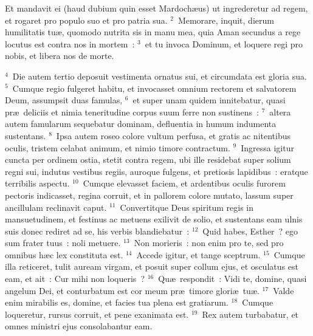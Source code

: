 \lettrine[lines=10,image=true,loversize=0.05,lraise=-0.03]{E}{}t mandavit ei (haud dubium quin esset Mardoch\ae us) ut ingrederetur ad regem, et rogaret pro populo suo et pro patria sua.
${}^{2}$~Memorare, inquit, dierum humilitatis tu\ae , quomodo nutrita sis in manu mea, quia Aman secundus a rege locutus est contra nos in mortem~:
${}^{3}$~et tu invoca Dominum, et loquere regi pro nobis, et libera nos de morte.


${}^{4}$~Die autem tertio deposuit vestimenta ornatus sui, et circumdata est gloria sua.
${}^{5}$~Cumque regio fulgeret habitu, et invocasset omnium rectorem et salvatorem Deum, assumpsit duas famulas,
${}^{6}$~et super unam quidem innitebatur, quasi pr\ae\ deliciis et nimia teneritudine corpus suum ferre non sustinens~:
${}^{7}$~altera autem famularum sequebatur dominam, defluentia in humum indumenta sustentans.
${}^{8}$~Ipsa autem roseo colore vultum perfusa, et gratis ac nitentibus oculis, tristem celabat animum, et nimio timore contractum.
${}^{9}$~Ingressa igitur cuncta per ordinem ostia, stetit contra regem, ubi ille residebat super solium regni sui, indutus vestibus regiis, auroque fulgens, et pretiosis lapidibus~: eratque terribilis aspectu.
${}^{10}$~Cumque elevasset faciem, et ardentibus oculis furorem pectoris indicasset, regina corruit, et in pallorem colore mutato, lassum super ancillulam reclinavit caput.
${}^{11}$~Convertitque Deus spiritum regis in mansuetudinem, et festinus ac metuens exilivit de solio, et sustentans eam ulnis suis donec rediret ad se, his verbis blandiebatur~:
${}^{12}$~Quid habes, Esther~? ego sum frater tuus~: noli metuere.
${}^{13}$~Non morieris~: non enim pro te, sed pro omnibus h\ae c lex constituta est.
${}^{14}$~Accede igitur, et tange sceptrum.
${}^{15}$~Cumque illa reticeret, tulit auream virgam, et posuit super collum ejus, et osculatus est eam, et ait~: Cur mihi non loqueris~?
${}^{16}$~Qu\ae\ respondit~: Vidi te, domine, quasi angelum Dei, et conturbatum est cor meum pr\ae\ timore glori\ae\ tu\ae .
${}^{17}$~Valde enim mirabilis es, domine, et facies tua plena est gratiarum.
${}^{18}$~Cumque loqueretur, rursus corruit, et pene exanimata est.
${}^{19}$~Rex autem turbabatur, et omnes ministri ejus consolabantur eam.

